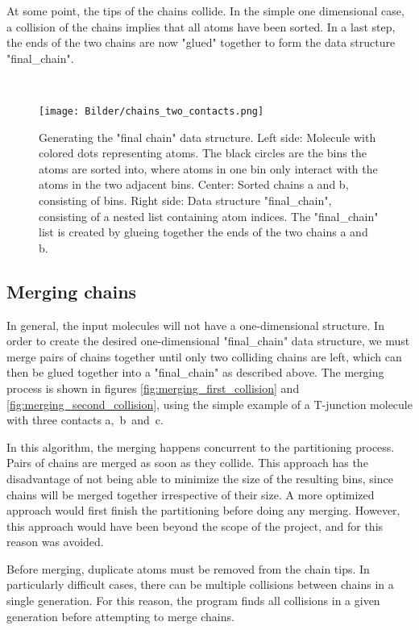\documentclass[11pt,a4paper]{article}
\begin{document}
At some point, the tips of the chains collide. In the simple one dimensional case, a collision of the chains implies that all atoms have been sorted. In a last step, the ends of the two chains are now "glued" together to form the data structure "final\_chain".

\

\begin{figure}[h]
   \centering
   \texttt{[image: Bilder/chains\_two\_contacts.png]}
   \caption{Generating the "final chain" data structure. Left side: Molecule with colored dots representing atoms. The black circles are the bins the atoms are sorted into, where atoms in one bin only interact with the atoms in the two adjacent bins. Center: Sorted chains a and b, consisting of bins. Right side: Data structure "final\_chain", consisting of a nested list containing atom indices. The "final\_chain" list is created by glueing together the ends of the two chains a and b.}
   \label{fig:chains_two_contacts}
\end{figure}

\newpage

\subsection{Merging chains}

In general, the input molecules will not have a one-dimensional structure. In order to create the desired one-dimensional "final\_chain" data structure,  we must merge pairs of chains together until only two colliding chains are left, which can then be glued together into a  "final\_chain"  as described above. The merging process is shown in figures \ref{fig:merging_first_collision} and \ref{fig:merging_second_collision}, using the simple example of a T-junction molecule with three contacts a,~b~and~c.

In this algorithm, the merging happens concurrent to the partitioning process. Pairs of chains are merged as soon as they collide. This approach has the disadvantage of not being able to minimize the size of the resulting bins, since chains will be merged together irrespective of their size. A more optimized approach would first finish the partitioning before doing any merging. However, this approach would have been beyond the scope of the project, and for this reason was avoided.

Before merging, duplicate atoms must be removed from the chain tips. In particularly difficult cases, there can be multiple collisions between chains in a single generation. For this reason, the program finds all collisions in a given generation before attempting to merge chains.
\end{document}
